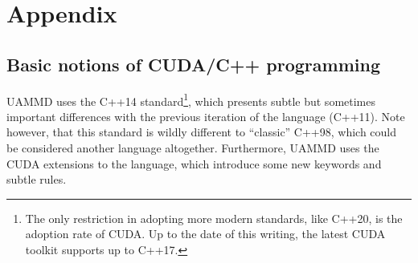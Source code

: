 \documentclass[ twoside,openright,titlepage,numbers=noenddot,%
headinclude,footinclude,cleardoublepage=empty,abstract=on,
BCOR=5mm,paper=b5,fontsize=11pt, dvipsnames
]{scrreprt}
\newcommand{\uammd}{\gls{UAMMD}\xspace}
\begin{document}
%
%
%

\newpage
\cleardoublepage

\part{Appendix}

\appendix

\chapter{Basic notions of CUDA/C++ programming}\label{sec:cpp}

\uammd uses the C++14 standard\footnote{The only restriction in adopting more modern standards, like C++20, is the adoption rate of CUDA. Up to the date of this writing, the latest CUDA toolkit supports up to C++17.}, which presents subtle but sometimes important differences with the previous iteration of the language (C++11). Note however, that this standard is wildly different to ``classic'' C++98, which could be considered another language altogether. Furthermore, \uammd uses the CUDA extensions to the language, which introduce some new keywords and subtle rules.
\end{document}
